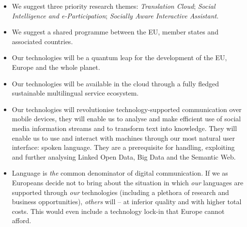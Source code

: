 \documentclass[10pt, plain]{../../metanetpaper}
\begin{document}
\begin{multicols}{2}
\begin{itemize}
  \item We suggest three priority research themes: \emph{Translation Cloud}; \emph{Social Intelligence and e-Participation}; \emph{Socially Aware Interactive Assistant}.
  \item We suggest a shared programme between the EU, member states and associated countries.
  \item Our technologies will be a quantum leap for the development of the EU, Europe and the whole planet.
  \item Our technologies will be available in the cloud through a fully fledged sustainable multilingual service ecosystem.
  \item Our technologies will revolutionise technology-supported communication over mobile devices, they will enable us to analyse and make efficient use of social media information streams and to transform text into knowledge. They will enable us to use and interact with machines through our most natural user interface: spoken language. They are a prerequisite for handling, exploiting and further analysing Linked Open Data, Big Data and the Semantic Web.
  \item Language is \emph{the} common denominator of digital communication. If we as Europeans decide not to bring about the situation in which \emph{our} languages are supported through \emph{our} technologies (including a plethora of research and business opportunities), \emph{others} will -- at inferior quality and with higher total costs. This would even include a technology lock-in that Europe cannot afford.
  \end{itemize}
\end{multicols}


{}
\end{document}
